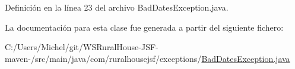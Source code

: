 Definición en la línea 23 del archivo Bad\+Dates\+Exception.\+java.



La documentación para esta clase fue generada a partir del siguiente fichero\+:\begin{DoxyCompactItemize}
\item 
C\+:/\+Users/\+Michel/git/\+W\+S\+Rural\+House-\/\+J\+S\+F-\/maven-\//src/main/java/com/ruralhousejsf/exceptions/\mbox{\hyperlink{_bad_dates_exception_8java}{Bad\+Dates\+Exception.\+java}}\end{DoxyCompactItemize}
